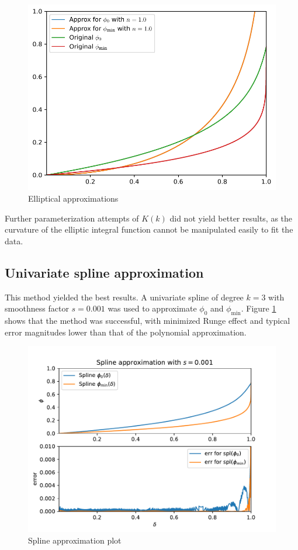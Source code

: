 \begin{figure}[H]
    \centering
    \includegraphics[scale=0.5]{plots/elliptical-approx.pdf}
    \caption{Elliptical approximations}
\end{figure}

Further parameterization attempts of $K(k)$ did not yield better results, as the curvature of the elliptic integral function cannot be manipulated easily to fit the data.

\subsection{Univariate spline approximation}

This method yielded the best results. A univariate spline of degree $k=3$ with smoothness factor $s=0.001$ was used to approximate $\phi_0$ and $\phi_\mathrm{min}$.
Figure \ref{splineplot} shows that the method was successful, with minimized Runge effect and typical error magnitudes lower than that of the polynomial approximation.

\begin{figure}[H]
    \centering
    \includegraphics[scale=0.8]{plots/spline.pdf}
    \caption{Spline approximation plot}\label{splineplot}
\end{figure}

